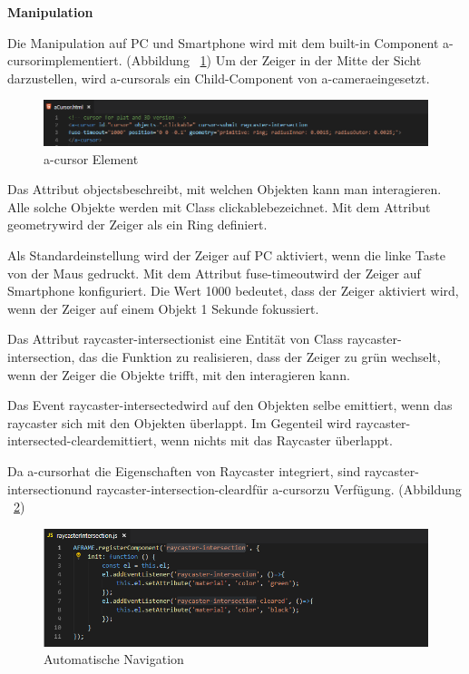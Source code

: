   \textbf{Manipulation}
  
  Die Manipulation auf PC und Smartphone wird mit dem built-in Component \glqq a-cursor\grqq implementiert. (Abbildung ~\ref{fig:aCursorElement}) Um der Zeiger in der Mitte der Sicht darzustellen, wird \glqq a-cursor\grqq als ein Child-Component von \glqq a-camera\grqq eingesetzt.
  
 \begin{figure}[ht]
\vspace*{0.3cm}
\centering
\includegraphics[width=\textwidth]{images/aCursorElement.png}
\caption[a-cursor Element]{a-cursor Element}
\label{fig:aCursorElement} 
\end{figure}
  
  Das Attribut \glqq objects\grqq beschreibt, mit welchen Objekten kann man interagieren. Alle solche Objekte werden mit Class \glqq clickable\grqq bezeichnet. Mit dem Attribut \glqq geometry\grqq wird der Zeiger als ein Ring definiert.
  
  Als Standardeinstellung wird der Zeiger auf PC aktiviert, wenn die linke Taste von der Maus gedruckt. Mit dem Attribut \glqq fuse-timeout\grqq wird der Zeiger auf Smartphone konfiguriert. Die Wert 1000 bedeutet, dass der Zeiger aktiviert wird, wenn der Zeiger auf einem Objekt 1 Sekunde fokussiert.
  
  Das Attribut \glqq raycaster-intersection\grqq ist eine Entität von Class \glqq raycaster-intersection\grqq, das die Funktion zu realisieren, dass der Zeiger zu grün wechselt, wenn der Zeiger die Objekte trifft, mit den interagieren kann.
  
  Das Event \glqq raycaster-intersected\grqq wird auf den Objekten selbe emittiert, wenn das raycaster sich mit den Objekten überlappt. Im Gegenteil wird \glqq raycaster-intersected-cleard\grqq emittiert, wenn nichts mit das Raycaster überlappt.
  
  Da \glqq a-cursor\grqq hat die Eigenschaften von Raycaster integriert, sind \glqq raycaster-intersection\grqq und \glqq raycaster-intersection-cleard\grqq für \glqq a-cursor\grqq zu Verfügung. (Abbildung ~\ref{fig:raycasterIntersection})
  
\begin{figure}[ht]
\vspace*{0.3cm}
\centering
\includegraphics[width=\textwidth]{images/raycasterIntersection.png}
\caption[Automatische Navigation]{Automatische Navigation}
\label{fig:raycasterIntersection} 
\end{figure}
  
